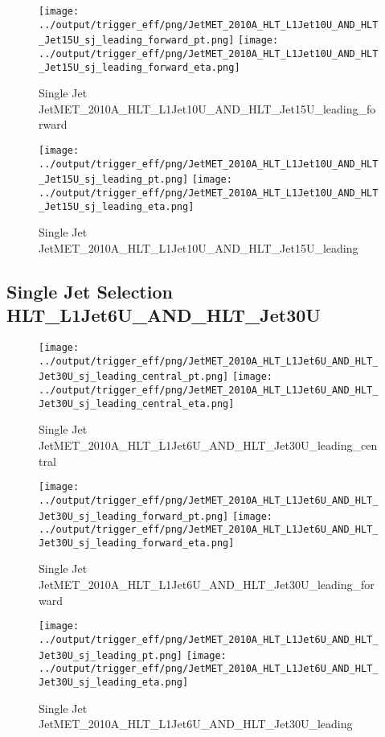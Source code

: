 \documentclass[11pt]{article}
\begin{document}
\begin{figure}[ht]
\centering
\texttt{[image: ../output/trigger\_eff/png/JetMET\_2010A\_HLT\_L1Jet10U\_AND\_HLT\_Jet15U\_sj\_leading\_forward\_pt.png]}
\texttt{[image: ../output/trigger\_eff/png/JetMET\_2010A\_HLT\_L1Jet10U\_AND\_HLT\_Jet15U\_sj\_leading\_forward\_eta.png]}
\caption{Single Jet JetMET\_2010A\_HLT\_L1Jet10U\_AND\_HLT\_Jet15U\_leading\_forward}
\label{fig:jetmet_sj_L1Jet10U_AND_HLT_Jet15U_leading_forward}
\end{figure}

\begin{figure}[ht]
\centering
\texttt{[image: ../output/trigger\_eff/png/JetMET\_2010A\_HLT\_L1Jet10U\_AND\_HLT\_Jet15U\_sj\_leading\_pt.png]}
\texttt{[image: ../output/trigger\_eff/png/JetMET\_2010A\_HLT\_L1Jet10U\_AND\_HLT\_Jet15U\_sj\_leading\_eta.png]}
\caption{Single Jet JetMET\_2010A\_HLT\_L1Jet10U\_AND\_HLT\_Jet15U\_leading}
\label{fig:jetmet_sj_L1Jet10U_AND_HLT_Jet15U_leading}
\end{figure}


\newpage
\subsection{Single Jet Selection HLT\_L1Jet6U\_AND\_HLT\_Jet30U}
\begin{figure}[ht]
\centering
\texttt{[image: ../output/trigger\_eff/png/JetMET\_2010A\_HLT\_L1Jet6U\_AND\_HLT\_Jet30U\_sj\_leading\_central\_pt.png]}
\texttt{[image: ../output/trigger\_eff/png/JetMET\_2010A\_HLT\_L1Jet6U\_AND\_HLT\_Jet30U\_sj\_leading\_central\_eta.png]}
\caption{Single Jet JetMET\_2010A\_HLT\_L1Jet6U\_AND\_HLT\_Jet30U\_leading\_central}
\label{fig:jetmet_sj_L1Jet6U_AND_HLT_Jet30U_leading_central}
\end{figure}

\begin{figure}[ht]
\centering
\texttt{[image: ../output/trigger\_eff/png/JetMET\_2010A\_HLT\_L1Jet6U\_AND\_HLT\_Jet30U\_sj\_leading\_forward\_pt.png]}
\texttt{[image: ../output/trigger\_eff/png/JetMET\_2010A\_HLT\_L1Jet6U\_AND\_HLT\_Jet30U\_sj\_leading\_forward\_eta.png]}
\caption{Single Jet JetMET\_2010A\_HLT\_L1Jet6U\_AND\_HLT\_Jet30U\_leading\_forward}
\label{fig:jetmet_sj_L1Jet6U_AND_HLT_Jet30U_leading_forward}
\end{figure}

\begin{figure}[ht]
\centering
\texttt{[image: ../output/trigger\_eff/png/JetMET\_2010A\_HLT\_L1Jet6U\_AND\_HLT\_Jet30U\_sj\_leading\_pt.png]}
\texttt{[image: ../output/trigger\_eff/png/JetMET\_2010A\_HLT\_L1Jet6U\_AND\_HLT\_Jet30U\_sj\_leading\_eta.png]}
\caption{Single Jet JetMET\_2010A\_HLT\_L1Jet6U\_AND\_HLT\_Jet30U\_leading}
\label{fig:jetmet_sj_L1Jet6U_AND_HLT_Jet30U_leading}
\end{figure}
\end{document}

